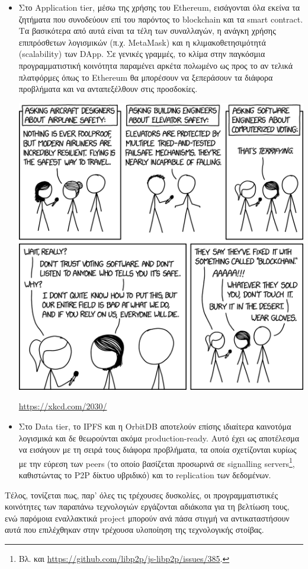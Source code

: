 \begin{itemize}
	\item Στο Application tier, μέσω της χρήσης του Ethereum, εισάγονται όλα εκείνα τα ζητήματα που συνοδεύουν επί του παρόντος το blockchain και τα smart contract. Τα βασικότερα από αυτά είναι τα τέλη των συναλλαγών, η ανάγκη χρήσης επιπρόσθετων λογισμικών (π.χ. MetaMask) και η κλιμακοθετησιμότητά (scalability) των DApp. Σε γενικές γραμμές, το κλίμα στην παγκόσμια προγραμματιστική κοινότητα παραμένει αρκέτα πολωμένο ως προς το αν τελικά πλατφόρμες όπως το Ethereum θα μπορέσουν να ξεπεράσουν τα διάφορα προβλήματα και να ανταπεξέλθουν στις προσδοκίες.

	\begin{enumitemcenteredfigure}
		\includegraphics[width=.50\textwidth]{assets/figures/chapter-5/5.1.xkcd_2030_voting_software}
		\caption{\url{https://xkcd.com/2030/}}
	\end{enumitemcenteredfigure}

	\item Στο Data tier, το IPFS και η OrbitDB αποτελούν επίσης ιδιαίτερα καινοτόμα λογισμικά και δε θεωρούνται ακόμα production-ready. Αυτό έχει ως αποτέλεσμα να εισάγουν με τη σειρά τους διάφορα προβλήματα, τα οποία σχετίζονται κυρίως με την εύρεση των peers (το οποίο βασίζεται προσωρινά σε signalling servers\footnote{Βλ. και \url{https://github.com/libp2p/js-libp2p/issues/385}.}, καθιστώντας το P2P δίκτυο υβριδικό) και το replication των δεδομένων.
\end{itemize}

Τέλος, τονίζεται πως, παρ' όλες τις τρέχουσες δυσκολίες, οι προγραμματιστικές κοινότητες των παραπάνω τεχνολογιών εργάζονται αδιάκοπα για τη βελτίωση τους, ενώ παρόμοια εναλλακτικά project μπορούν ανά πάσα στιγμή να αντικαταστήσουν αυτά που επιλέχθηκαν στην τρέχουσα υλοποίηση της τεχνολογικής στοίβας.
